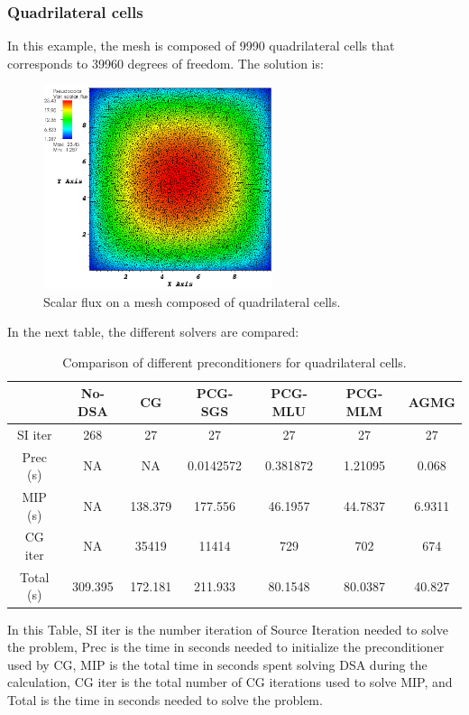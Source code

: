 \subsubsection{Quadrilateral cells}
In this example, the mesh is composed of 9990 quadrilateral cells that corresponds 
to 39960 degrees of freedom. The solution is:
\begin{figure}[H]
\centering
\includegraphics[width=0.6\textwidth]{./Dsa/homog_quad_crop}
\caption{Scalar flux on a mesh composed of quadrilateral cells.}
\end{figure}
In the next table, the different solvers are compared:
\begin{table}[H]
\begin{center}
\caption{Comparison of different preconditioners for quadrilateral cells.}
\begin{tabular}{|c|c|c|c|c|c|c|}
\hline
 & No-DSA & CG & PCG-SGS & PCG-MLU & PCG-MLM & AGMG\\
\hline
SI iter & 268 & 27 & 27 & 27 & 27 & 27 \\
Prec (s) & NA & NA & 0.0142572 & 0.381872 & 1.21095 & 0.068\\
MIP (s) & NA & 138.379 & 177.556 & 46.1957 & 44.7837 & 6.9311\\
CG iter & NA & 35419 & 11414 & 729 & 702 & 674\\
Total (s) & 309.395 & 172.181 & 211.933 & 80.1548 & 80.0387 &
40.827\\
\hline
\end{tabular}
\end{center}
\end{table}
In this Table, SI iter is the number iteration of Source Iteration
needed to solve the problem, Prec is the time in seconds needed to
initialize the preconditioner used by CG, MIP is the total time in
seconds spent solving DSA during the calculation, CG iter is the total number 
of CG iterations used to solve MIP, and Total is the time in
seconds needed to solve the problem.


